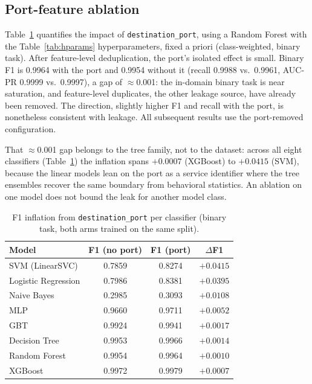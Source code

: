 \documentclass[11pt,conference,a4paper]{IEEEtran}
\begin{document}
\subsection{Port-feature ablation}

Table~\ref{tab:port-ablation} quantifies the impact of \texttt{destination\_port}, using a Random Forest with the Table~\ref{tab:hparams} hyperparameters, fixed a priori (class-weighted, binary task). After feature-level deduplication, the port's isolated effect is small. Binary F1 is 0.9964 with the port and 0.9954 without it (recall 0.9988 vs.\ 0.9961, AUC-PR 0.9999 vs.\ 0.9997), a gap of $\approx$0.001: the in-domain binary task is near saturation, and feature-level duplicates, the other leakage source, have already been removed. The direction, slightly higher F1 and recall with the port, is nonetheless consistent with leakage. All subsequent results use the port-removed configuration.

That $\approx$0.001 gap belongs to the tree family, not to the dataset: across all eight classifiers (Table~\ref{tab:port-ablation}) the inflation spans $+0.0007$ (XGBoost) to $+0.0415$ (SVM), because the linear models lean on the port as a service identifier where the tree ensembles recover the same boundary from behavioral statistics. An ablation on one model does not bound the leak for another model class.


\begin{table}[htbp]
  \caption{F1 inflation from \texttt{destination\_port} per classifier (binary task, both arms trained on the same split).}
  \label{tab:port-ablation}
  \centering
  \footnotesize
  \begin{tabular}{lccc}
    \toprule
    Model & F1 (no port) & F1 (port) & $\Delta$F1 \\
    \midrule
    SVM (LinearSVC)     & 0.7859 & 0.8274 & $+0.0415$ \\
    Logistic Regression & 0.7986 & 0.8381 & $+0.0395$ \\
    Naive Bayes         & 0.2985 & 0.3093 & $+0.0108$ \\
    MLP                 & 0.9660 & 0.9711 & $+0.0052$ \\
    GBT                 & 0.9924 & 0.9941 & $+0.0017$ \\
    Decision Tree       & 0.9953 & 0.9966 & $+0.0014$ \\
    Random Forest       & 0.9954 & 0.9964 & $+0.0010$ \\
    XGBoost             & 0.9972 & 0.9979 & $+0.0007$ \\
    \bottomrule
  \end{tabular}
\end{table}
\end{document}
